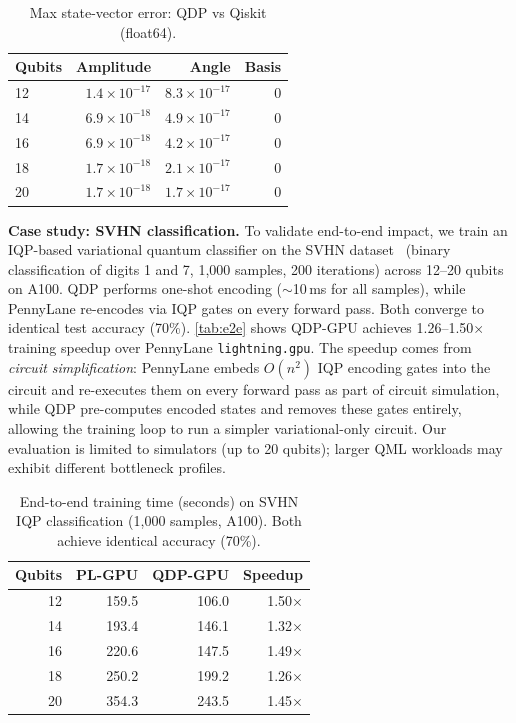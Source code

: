 \documentclass[sigconf, nonacm]{acmart}
\begin{document}
\begin{table}[h]
  \caption{Max state-vector error: QDP vs Qiskit (float64).}
  \label{tab:correct}
  \begin{tabular}{lrrr}
    \toprule
    Qubits & Amplitude & Angle & Basis \\
    \midrule
    12 & $1.4 \times 10^{-17}$ & $8.3 \times 10^{-17}$ & $0$ \\
    14 & $6.9 \times 10^{-18}$ & $4.9 \times 10^{-17}$ & $0$ \\
    16 & $6.9 \times 10^{-18}$ & $4.2 \times 10^{-17}$ & $0$ \\
    18 & $1.7 \times 10^{-18}$ & $2.1 \times 10^{-17}$ & $0$ \\
    20 & $1.7 \times 10^{-18}$ & $1.7 \times 10^{-17}$ & $0$ \\
    \bottomrule
  \end{tabular}
\end{table}

\textbf{Case study: SVHN classification.}
To validate end-to-end impact, we train an IQP-based variational quantum classifier on the SVHN dataset~\cite{svhn} (binary classification of digits 1 and 7, 1{,}000 samples, 200 iterations) across 12--20 qubits on A100.
QDP performs one-shot encoding ($\sim$10\,ms for all samples), while PennyLane re-encodes via IQP gates on every forward pass.
Both converge to identical test accuracy (70\%).
\autoref{tab:e2e} shows QDP-GPU achieves 1.26--1.50$\times$ training speedup over PennyLane \texttt{lightning.gpu}.
The speedup comes from \emph{circuit simplification}: PennyLane embeds $O(n^2)$ IQP encoding gates into the circuit and re-executes them on every forward pass as part of circuit simulation, while QDP pre-computes encoded states and removes these gates entirely, allowing the training loop to run a simpler variational-only circuit.
Our evaluation is limited to simulators (up to 20 qubits); larger QML workloads may exhibit different bottleneck profiles.

\begin{table}[h]
  \caption{End-to-end training time (seconds) on SVHN IQP classification (1{,}000 samples, A100). Both achieve identical accuracy (70\%).}
  \label{tab:e2e}
  \begin{tabular}{rrrr}
    \toprule
    Qubits & PL-GPU & QDP-GPU & Speedup \\
    \midrule
    12 & 159.5 & 106.0 & 1.50$\times$ \\
    14 & 193.4 & 146.1 & 1.32$\times$ \\
    16 & 220.6 & 147.5 & 1.49$\times$ \\
    18 & 250.2 & 199.2 & 1.26$\times$ \\
    20 & 354.3 & 243.5 & 1.45$\times$ \\
    \bottomrule
  \end{tabular}
\end{table}
\end{document}
